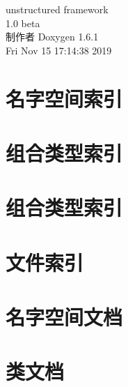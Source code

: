 \documentclass[a4paper]{book}
\begin{document}
\hypersetup{pageanchor=false}
\begin{titlepage}
\vspace*{7cm}
\begin{center}
{\Large unstructured framework \\[1ex]\large 1.0 beta }\\
\vspace*{1cm}
{\large 制作者 Doxygen 1.6.1}\\
\vspace*{0.5cm}
{\small Fri Nov 15 17:14:38 2019}\\
\end{center}
\end{titlepage}
\clearemptydoublepage
{}
\tableofcontents
\clearemptydoublepage
{}
\hypersetup{pageanchor=true}
\chapter{名字空间索引}

\chapter{组合类型索引}

\chapter{组合类型索引}

\chapter{文件索引}

\chapter{名字空间文档}





\chapter{类文档}
























\end{document}
